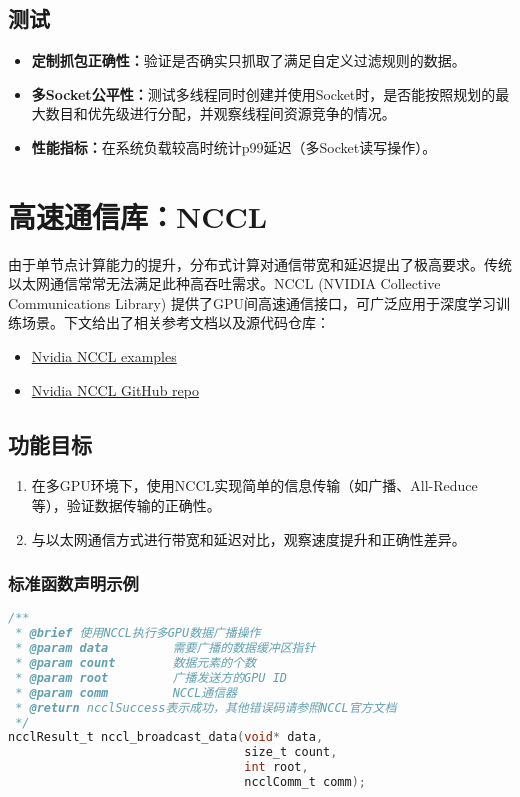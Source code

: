 \subsection{测试}
\begin{itemize}
    \item \textbf{定制抓包正确性：}验证是否确实只抓取了满足自定义过滤规则的数据。  
    \item \textbf{多Socket公平性：}测试多线程同时创建并使用Socket时，是否能按照规划的最大数目和优先级进行分配，并观察线程间资源竞争的情况。
    \item \textbf{性能指标：}在系统负载较高时统计p99延迟（多Socket读写操作）。
\end{itemize}

\section{高速通信库：NCCL}
由于单节点计算能力的提升，分布式计算对通信带宽和延迟提出了极高要求。传统以太网通信常常无法满足此种高吞吐需求。NCCL (NVIDIA Collective Communications Library) 提供了GPU间高速通信接口，可广泛应用于深度学习训练场景。下文给出了相关参考文档以及源代码仓库：
\begin{itemize}
    \item \href{https://docs.nvidia.com/deeplearning/nccl/user-guide/docs/examples.html#communicator-creation-and-destruction-examples}{Nvidia NCCL examples}
    \item \href{https://github.com/NVIDIA/nccl}{Nvidia NCCL GitHub repo}
\end{itemize}

\subsection{功能目标}
\begin{enumerate}
    \item 在多GPU环境下，使用NCCL实现简单的信息传输（如广播、All-Reduce等），验证数据传输的正确性。
    \item 与以太网通信方式进行带宽和延迟对比，观察速度提升和正确性差异。
\end{enumerate}

\subsubsection{标准函数声明示例}
\begin{lstlisting}[language=C, caption={示例：NCCL通信例程接口}]
/**
 * @brief 使用NCCL执行多GPU数据广播操作
 * @param data         需要广播的数据缓冲区指针
 * @param count        数据元素的个数
 * @param root         广播发送方的GPU ID
 * @param comm         NCCL通信器
 * @return ncclSuccess表示成功，其他错误码请参照NCCL官方文档
 */
ncclResult_t nccl_broadcast_data(void* data, 
                                 size_t count, 
                                 int root, 
                                 ncclComm_t comm);
\end{lstlisting}

